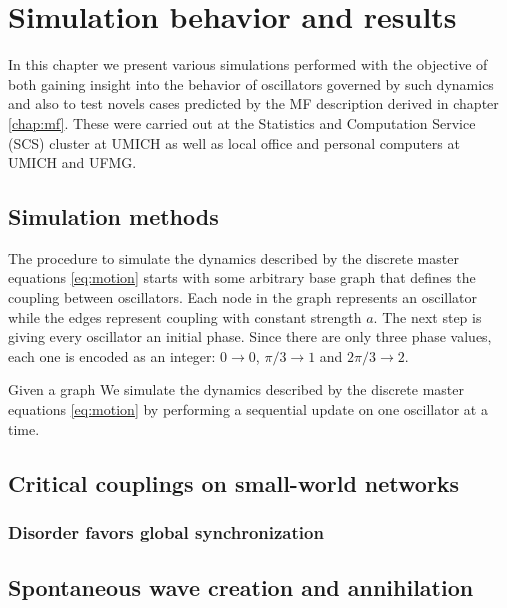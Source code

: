 \chapter{Simulation behavior and results}
\label{chap:simulation}

In this chapter we present various simulations performed with the objective of both gaining insight into the behavior of oscillators
governed by such dynamics and also to test novels cases predicted by the MF description derived in chapter \ref{chap:mf}. These were
carried out at the Statistics and Computation Service (SCS) cluster at UMICH as well as local office and personal computers at UMICH
and UFMG.

\section{Simulation methods}

The procedure to simulate the dynamics described by the discrete master equations \ref{eq:motion} starts with some arbitrary base graph
that defines the coupling between oscillators. Each node in the graph represents an oscillator while the edges represent coupling with
constant strength $a$. The next step is giving every oscillator an initial phase. Since there are only three phase values, each one is
encoded as an integer: $0 \rightarrow 0$, $\pi/3 \rightarrow 1$ and $2\pi/3 \rightarrow 2$.

Given a graph
We simulate the dynamics described by the discrete master equations \ref{eq:motion} by performing a sequential update on one oscillator
at a time. 


\section{Critical couplings on small-world networks}

\subsection{Disorder favors global synchronization}

\section{Spontaneous wave creation and annihilation}
